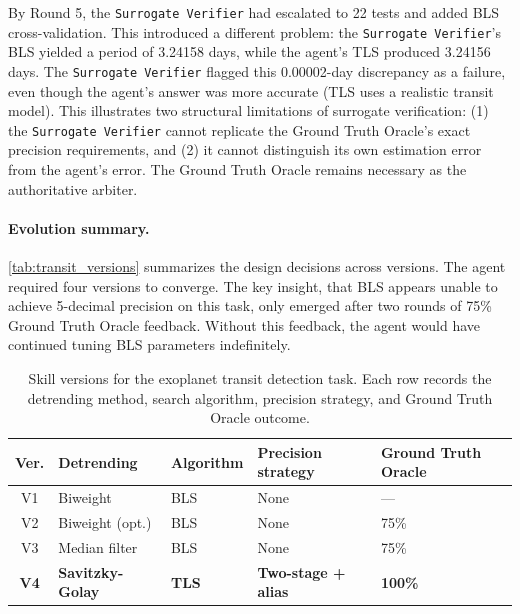 \documentclass{article}
\begin{document}
By Round 5, the \texttt{Surrogate Verifier} had escalated to 22 tests and added BLS cross-validation. This introduced a different problem: the \texttt{Surrogate Verifier}'s BLS yielded a period of 3.24158 days, while the agent's TLS produced 3.24156 days. The \texttt{Surrogate Verifier} flagged this 0.00002-day discrepancy as a failure, even though the agent's answer was more accurate (TLS uses a realistic transit model). This illustrates two structural limitations of surrogate verification: (1) the \texttt{Surrogate Verifier} cannot replicate the Ground Truth Oracle's exact precision requirements, and (2) it cannot distinguish its own estimation error from the agent's error. The Ground Truth Oracle remains necessary as the authoritative arbiter.

\paragraph{Evolution summary.}
\autoref{tab:transit_versions} summarizes the design decisions across versions. The agent required four versions to converge. The key insight, that BLS appears unable to achieve 5-decimal precision on this task, only emerged after two rounds of 75\% Ground Truth Oracle feedback. Without this feedback, the agent would have continued tuning BLS parameters indefinitely.

\begin{table}[ht!]
\centering
\caption{Skill versions for the exoplanet transit detection task. Each row records the detrending method, search algorithm, precision strategy, and Ground Truth Oracle outcome.}
\label{tab:transit_versions}
\footnotesize
\begin{tabular}{@{}cllll@{}}
\toprule
\textbf{Ver.} & \textbf{Detrending} & \textbf{Algorithm} & \textbf{Precision strategy} & \textbf{Ground Truth Oracle} \\
\midrule
V1 & Biweight & BLS & None & --- \\
V2 & Biweight (opt.) & BLS & None & 75\% \\
V3 & Median filter & BLS & None & 75\% \\
\textbf{V4} & \textbf{Savitzky-Golay} & \textbf{TLS} & \textbf{Two-stage + alias} & \textbf{100\%} \\
\bottomrule
\end{tabular}
\end{table}
\end{document}
